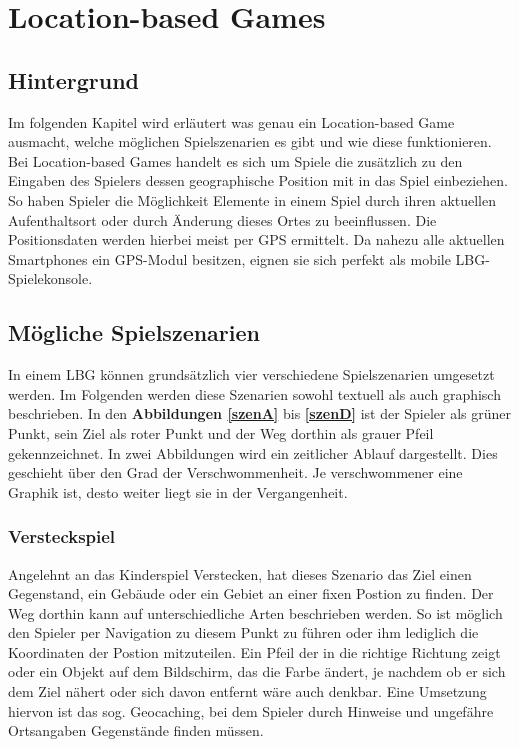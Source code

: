 \chapter{Location-based Games} 
\section{Hintergrund}
Im folgenden Kapitel wird erläutert was genau ein Location-based Game ausmacht, welche möglichen Spielszenarien es gibt und wie diese funktionieren. Bei Location-based Games handelt es sich um Spiele die zusätzlich zu den Eingaben des Spielers dessen geographische Position mit in das Spiel einbeziehen. So haben Spieler die Möglichkeit Elemente in einem Spiel durch ihren aktuellen Aufenthaltsort oder durch Änderung dieses Ortes zu beeinflussen. Die Positionsdaten werden hierbei meist per GPS ermittelt. Da nahezu alle aktuellen Smartphones ein GPS-Modul besitzen, eignen sie sich perfekt als mobile LBG-Spielekonsole.
 
\section{Mögliche Spielszenarien} 
In einem LBG können grundsätzlich vier verschiedene Spielszenarien umgesetzt werden. Im Folgenden werden diese Szenarien sowohl textuell als auch graphisch beschrieben. 
In den \textbf{Abbildungen \ref{szenA}} bis \textbf{\ref{szenD}} ist der Spieler als grüner Punkt, sein Ziel als roter Punkt und der Weg dorthin als grauer Pfeil gekennzeichnet. In zwei Abbildungen wird ein zeitlicher Ablauf dargestellt. Dies geschieht über den Grad der Verschwommenheit. Je verschwommener eine Graphik ist, desto weiter liegt sie in der Vergangenheit.

\subsection{Versteckspiel} 
\label{sec:szenarioVerstecken}

Angelehnt an das Kinderspiel Verstecken, hat dieses Szenario das Ziel einen Gegenstand, ein Gebäude oder ein Gebiet an einer fixen Postion zu finden. Der Weg dorthin kann auf unterschiedliche Arten beschrieben werden. So ist möglich den Spieler per Navigation zu diesem Punkt zu führen oder ihm lediglich die Koordinaten der Postion mitzuteilen. Ein Pfeil der in die richtige Richtung zeigt oder ein Objekt auf dem Bildschirm, das die Farbe ändert, je nachdem ob er sich dem Ziel nähert oder sich davon entfernt wäre auch denkbar. Eine Umsetzung hiervon ist das sog. Geocaching, bei dem Spieler durch Hinweise und ungefähre Ortsangaben Gegenstände finden müssen.
\cite{Dyer:2010wt}


